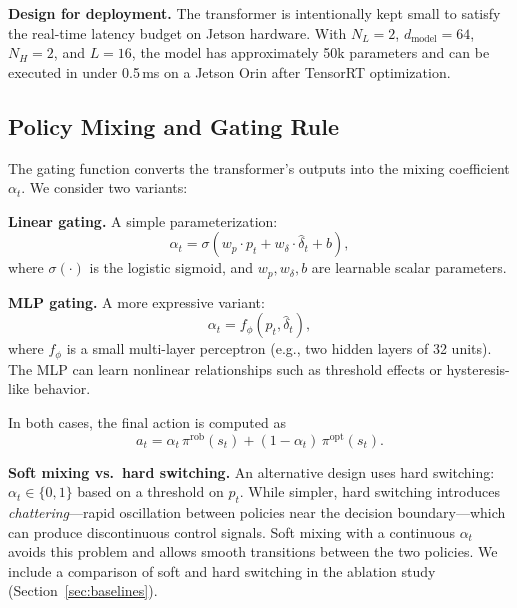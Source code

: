\documentclass[conference]{IEEEtran}
\newcommand{\piopt}{\pi^{\text{opt}}}
\newcommand{\pirob}{\pi^{\text{rob}}}
\begin{document}
\textbf{Design for deployment.}  The transformer is intentionally kept
small to satisfy the real-time latency budget on Jetson hardware.  With
$N_L = 2$, $d_{\text{model}} = 64$, $N_H = 2$, and $L = 16$, the model
has approximately 50k parameters and can be executed in under 0.5\,ms
on a Jetson Orin after TensorRT optimization.

\subsection{Policy Mixing and Gating Rule}\label{sec:gating}

The gating function converts the transformer's outputs into the mixing
coefficient $\alpha_t$.  We consider two variants:

\textbf{Linear gating.}  A simple parameterization:
\begin{equation}\label{eq:gate_linear}
\alpha_t = \sigma(w_p \cdot p_t + w_\delta \cdot \hat{\delta}_t + b),
\end{equation}
where $\sigma(\cdot)$ is the logistic sigmoid, and $w_p, w_\delta, b$
are learnable scalar parameters.

\textbf{MLP gating.}  A more expressive variant:
\begin{equation}\label{eq:gate_mlp}
\alpha_t = f_\phi(p_t, \hat{\delta}_t),
\end{equation}
where $f_\phi$ is a small multi-layer perceptron (e.g., two hidden layers
of 32 units).  The MLP can learn nonlinear relationships such as
threshold effects or hysteresis-like behavior.

In both cases, the final action is computed as
\begin{equation}\label{eq:action_mix}
a_t = \alpha_t\,\pirob(s_t) + (1 - \alpha_t)\,\piopt(s_t).
\end{equation}

\textbf{Soft mixing vs.\ hard switching.}  An alternative design uses
hard switching: $\alpha_t \in \{0, 1\}$ based on a threshold on $p_t$.
While simpler, hard switching introduces \emph{chattering}---rapid
oscillation between policies near the decision boundary---which can
produce discontinuous control signals.  Soft mixing with a continuous
$\alpha_t$ avoids this problem and allows smooth transitions between the
two policies.  We include a comparison of soft and hard switching in the
ablation study (Section~\ref{sec:baselines}).
\end{document}
